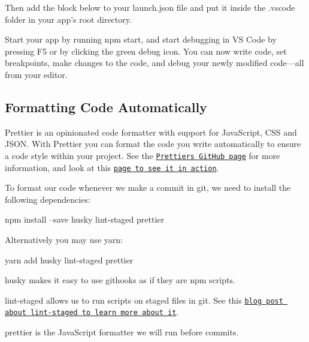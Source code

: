 Then add the block below to your {\ttfamily launch.\+json} file and put it inside the {\ttfamily .vscode} folder in your app’s root directory.




Start your app by running {\ttfamily npm start}, and start debugging in VS Code by pressing {\ttfamily F5} or by clicking the green debug icon. You can now write code, set breakpoints, make changes to the code, and debug your newly modified code—all from your editor.

\subsection*{Formatting Code Automatically}

Prettier is an opinionated code formatter with support for Java\+Script, C\+SS and J\+S\+ON. With Prettier you can format the code you write automatically to ensure a code style within your project. See the \href{https://github.com/prettier/prettier}{\tt Prettier\textquotesingle{}s Git\+Hub page} for more information, and look at this \href{https://prettier.github.io/prettier/}{\tt page to see it in action}.

To format our code whenever we make a commit in git, we need to install the following dependencies\+:


\begin{DoxyCode}
npm install --save husky lint-staged prettier
\end{DoxyCode}


Alternatively you may use {\ttfamily yarn}\+:


\begin{DoxyCode}
yarn add husky lint-staged prettier
\end{DoxyCode}



\begin{DoxyItemize}
\item {\ttfamily husky} makes it easy to use githooks as if they are npm scripts.
\item {\ttfamily lint-\/staged} allows us to run scripts on staged files in git. See this \href{https://medium.com/@okonetchnikov/make-linting-great-again-f3890e1ad6b8}{\tt blog post about lint-\/staged to learn more about it}.
\item {\ttfamily prettier} is the Java\+Script formatter we will run before commits.
\end{DoxyItemize}

